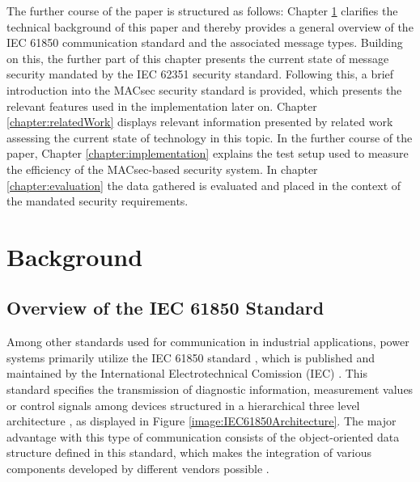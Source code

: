 \documentclass[conference, onecolumn, a4paper]{IEEEtran}
\begin{document}
\smallskip
The further course of the paper is structured as follows: Chapter \ref{chapter:fundamentals} clarifies the technical background of this paper and thereby 
provides a general overview of the IEC 61850 communication standard and the associated  message types. Building on this, the further part of this chapter 
presents the current state of message security mandated by the IEC 62351 security standard. Following this, a brief introduction into the MACsec security 
standard is provided, which presents the relevant features used in the implementation later on. Chapter \ref{chapter:relatedWork} displays relevant 
information presented by related work assessing the current state of technology in this topic. In the further course of the paper, Chapter 
\ref{chapter:implementation} explains the test setup used to measure the efficiency of the MACsec-based security system. In chapter \ref{chapter:evaluation} 
the data gathered is evaluated and placed in the context of the mandated security requirements. 

\section{Background}
\label{chapter:fundamentals}

\subsection{Overview of the IEC 61850 Standard}
\label{subchapter:IEC61850}
\noindent Among other standards used for communication in industrial applications, power systems primarily utilize the IEC 61850 standard \cite{IEC61850:2023}, 
which is published and maintained by the International Electrotechnical Comission (IEC) \cite{IEC61850_Overview:2006}. This standard specifies the 
transmission of diagnostic information, measurement values or control signals among devices structured in a hierarchical three level architecture 
\cite{SGRWin_IEC61850Architecture:2021}, as displayed in Figure \ref{image:IEC61850Architecture}. The major advantage with this type of communication 
consists of the object-oriented data structure defined in this standard, which makes the integration of various components developed by different vendors 
possible \cite[p. 5643]{Review_IEC62351:2019}. 
\end{document}
